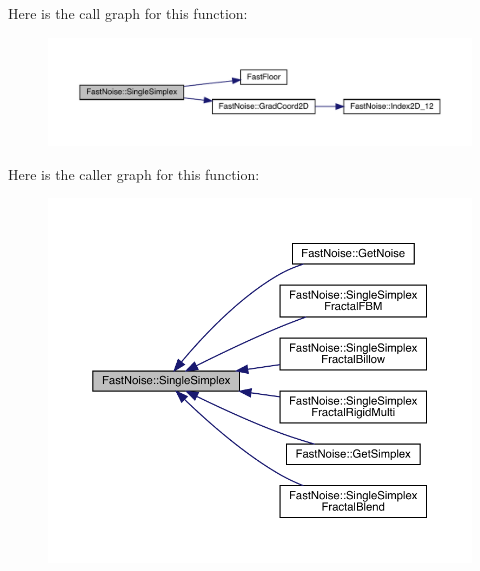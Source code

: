 Here is the call graph for this function\+:
\nopagebreak
\begin{figure}[H]
\begin{center}
\leavevmode
\includegraphics[width=350pt]{d1/dd8/class_fast_noise_a1aa539b6129719546bb4ed2847f1a11f_cgraph}
\end{center}
\end{figure}
Here is the caller graph for this function\+:
\nopagebreak
\begin{figure}[H]
\begin{center}
\leavevmode
\includegraphics[width=350pt]{d1/dd8/class_fast_noise_a1aa539b6129719546bb4ed2847f1a11f_icgraph}
\end{center}
\end{figure}
\mbox{\label{class_fast_noise_a5e40c643992d4099dbe7f0a5be6460e7}} 
